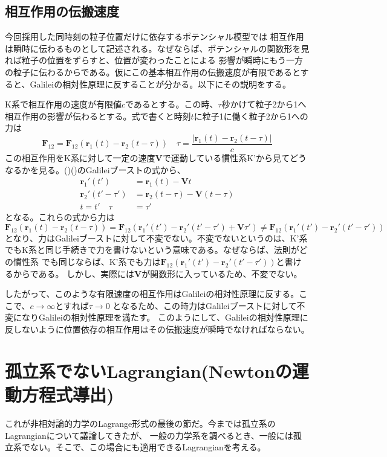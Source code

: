 \documentclass[a4paper,11pt]{ltjsarticle}
\begin{document}
\subsection{相互作用の伝搬速度}
今回採用した同時刻の粒子位置だけに依存するポテンシャル模型では
相互作用は瞬時に伝わるものとして記述される。なぜならば、ポテンシャルの関数形を見れば粒子の位置をずらすと、位置が変わったことによる
影響が瞬時にもう一方の粒子に伝わるからである。仮にこの基本相互作用の伝搬速度が有限であるとすると、Galileiの相対性原理に反することが分かる。以下にその説明をする。

K系で相互作用の速度が有限値$c$であるとする。この時、$\tau$秒かけて粒子2から1へ相互作用の影響が伝わるとする。式で書くと時刻$t$に粒子1に働く粒子2から1への力は
\[
\bm{F}_{12}=\bm{F}_{12}(\bm{r}_1(t)-\bm{r}_2(t-\tau)) \quad \tau=\frac{|\bm{r}_1(t)-\bm{r}_2(t-\tau)|}{c}
\]
この相互作用をK系に対して一定の速度$\bm{V}$で運動している慣性系K'から見てどうなるかを見る。()()のGalileiブーストの式から、
\begin{align*}
\bm{r}_1'(t')&=\bm{r}_1(t)-\bm{V}t
\\\bm{r}_2'(t'-\tau')&=\bm{r}_2(t-\tau)-\bm{V}(t-\tau)
\\t=t' \quad \tau&=\tau'
\end{align*}
となる。これらの式から力は
\[
\bm{F}_{12}(\bm{r}_1(t)-\bm{r}_2(t-\tau))=\bm{F}_{12}(\bm{r}_1'(t')-\bm{r}_2'(t'-\tau')+\bm{V}\tau')\ne \bm{F}_{12}(\bm{r}_1'(t')-\bm{r}_2'(t'-\tau'))
\]
となり、力はGalileiブーストに対して不変でない。不変でないというのは、K'系でもK系と同じ手続きで力を書けないという意味である。なぜならば、法則がどの慣性系
でも同じならば、K'系でも力は$\bm{F}_{12}(\bm{r}_1'(t')-\bm{r}_2'(t'-\tau'))$と書けるからである。
しかし、実際には$\bm{V}$が関数形に入っているため、不変でない。

したがって、このような有限速度の相互作用はGalileiの相対性原理に反する。ここで、$c\rightarrow \infty$とすれば$\tau \rightarrow 0$
となるため、この時力はGalileiブーストに対して不変になりGalileiの相対性原理を満たす。
このようにして、Galileiの相対性原理に反しないように位置依存の相互作用はその伝搬速度が瞬時でなければならない。

\section{孤立系でないLagrangian(Newtonの運動方程式導出)}
これが非相対論的力学のLagrange形式の最後の節だ。今までは孤立系のLagrangianについて議論してきたが、
一般の力学系を調べるとき、一般には孤立系でない。そこで、この場合にも適用できるLagrangianを考える。
\end{document}
